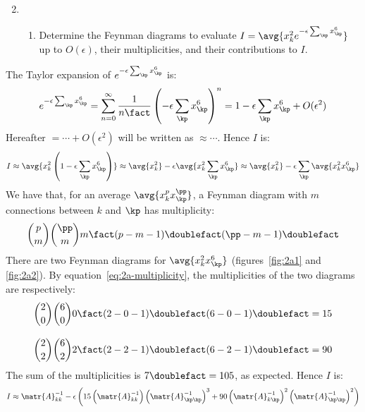 \begin{enumerate}[leftmargin=0cm]
  \setcounter{enumi}{1}
  \item
        \begin{enumerate}
          \item Determine the Feynman diagrams to evaluate
                $I = \avg{x_k^2 e^{- \epsilon \sum_\kp x_\kp^6 }}$
                up to $O(\epsilon)$, their multiplicities, and their contributions to $I$.
        \end{enumerate}
\end{enumerate}

The Taylor expansion of $e^{-\epsilon \sum_\kp x_\kp^6}$ is:
\begin{equation*}
  e^{-\epsilon \sum_\kp x_\kp^6}
  = \sum_{n=0}^{\infty} \frac{1}{n\fact} \left( -\epsilon \sum_\kp x_\kp^6 \right)^n
  = 1 - \epsilon \sum_\kp x_\kp^6 + O(\epsilon^2)
\end{equation*}
Hereafter $=\cdots + O(\epsilon^2)$ will be written as $\approx\cdots$.
Hence $I$ is:
\begin{equation*}
  I \approx \avg{x_k^2 \left(1 - \epsilon \sum_\kp x_\kp^6 \right)} \approx
  \avg{x_k^2} - \epsilon \avg{x_k^2 \sum_\kp x_\kp^6} \approx \avg{x_k^2} -
  \epsilon \sum_\kp \avg{x_k^2 x_\kp^6}
\end{equation*}
We have that, for an average $\avg{x_k^p x_\kp^\pp}$, a Feynman diagram with $m$
connections between $k$ and $\kp$ has multiplicity:
\begin{equation}{}
  \label{eq:2a-multiplicity}
  {p \choose m} {\pp \choose m} m\fact (p - m - 1)\doublefact (\pp - m - 1)\doublefact
\end{equation}
There are two Feynman diagrams for $\avg{x_k^2 x_\kp^6}$ (figures~\ref{fig:2a1}
and \ref{fig:2a2}).
By equation~\ref{eq:2a-multiplicity}, the multiplicities of the two diagrams are
respectively:
\begin{align*}{}
  {2 \choose 0} {6 \choose 0} 0\fact (2 - 0 - 1)\doublefact (6 - 0 - 1)\doublefact & = 15
  \\[2ex]
  {2 \choose 2} {6 \choose 2} 2\fact (2 - 2 - 1)\doublefact (6 - 2 - 1)\doublefact & = 90
\end{align*}
The sum of the multiplicities is $7\doublefact = 105$, as expected.
Hence $I$ is:
\begin{equation*}
  I \approx
  \matr{A}^{-1}_{kk} - \epsilon \left(
  15 \left(\matr{A}^{-1}_{kk}\right) \left(\matr{A}^{-1}_{\kp\kp}\right)^3 +
  90 \left(\matr{A}^{-1}_{k\kp}\right)^2 \left(\matr{A}^{-1}_{\kp\kp}\right)^2
  \right)
\end{equation*}

